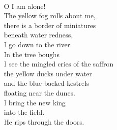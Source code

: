 \documentclass[smalldemyvopaper,11pt,twoside,onecolumn,openright,extrafontsizes]{memoir}
\begin{document}
\\O I am alone!
\\The yellow fog rolls about me,
\\there is a border of miniatures
\\beneath water redness,
\\I go down to the river.
\\In the tree boughs
\\I see the mingled cries of the saffron
\\the yellow ducks under water
\\and the blue-backed kestrels
\\floating near the dunes.
\\I bring the new king
\\into the field.
\\He rips through the doors.
\end{document}
